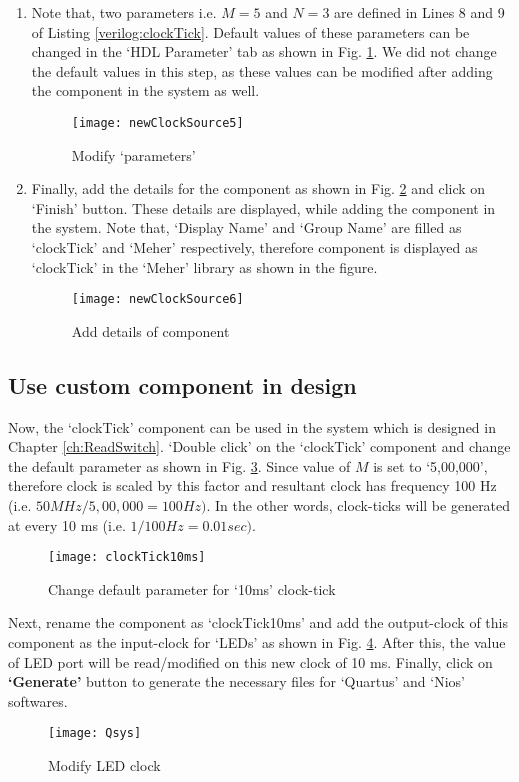 \begin{enumerate}
	\item Note that, two parameters i.e. $M = 5$ and $N = 3$ are defined in Lines 8 and 9 of Listing \ref{verilog:clockTick}. Default values of these parameters can be changed in the `HDL Parameter' tab as shown in Fig. \ref{fig:newClockSource5}. We did not change the default values in this step, as these values can be modified after adding the component in the system as well.
	\begin{figure}[!h]
		\centering
		\texttt{[image: newClockSource5]}
		\caption{Modify `parameters'}
		\label{fig:newClockSource5}
	\end{figure} 
	
	\item Finally, add the details for the component as shown in Fig. \ref{fig:newClockSource6} and click on `Finish' button. These details are displayed, while adding the component in the system. Note that, `Display Name' and `Group Name' are filled as `clockTick' and `Meher' respectively, therefore component is displayed as `clockTick' in the `Meher' library as shown in the figure.
	\begin{figure}[!h]
		\centering
		\texttt{[image: newClockSource6]}
		\caption{Add details of component}
		\label{fig:newClockSource6}
	\end{figure}
\end{enumerate}

\subsection{Use custom component in design}
Now, the `clockTick' component can be used in the system which is designed in Chapter \ref{ch:ReadSwitch}. `Double click' on the `clockTick' component and change the default parameter as shown in Fig. \ref{fig:clockTick10ms}. Since value of $M$ is set to `5,00,000', therefore clock is scaled by this factor and resultant clock has frequency 100 Hz (i.e. $50MHz/5,00,000 = 100 Hz)$. In the other words, clock-ticks will be generated at every 10 ms (i.e. $1/100Hz = 0.01 sec)$. 
\begin{figure}[!h]
	\centering
	\texttt{[image: clockTick10ms]}
	\caption{Change default parameter for `10ms' clock-tick}
	\label{fig:clockTick10ms}
\end{figure}

Next, rename the component as `clockTick10ms' and add the output-clock of this component as the input-clock for `LEDs' as shown in Fig. \ref{fig:Qsys}. After this, the value of LED port will be read/modified on this new clock of 10 ms. Finally, click on \textbf{`Generate'} button to generate the necessary files for `Quartus' and `Nios' softwares. 
\begin{figure}[!h]
	\centering
	\texttt{[image: Qsys]}
	\caption{Modify LED clock}
	\label{fig:Qsys}
\end{figure}

